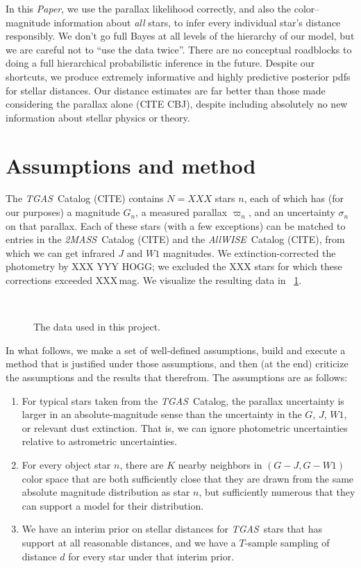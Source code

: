 \documentclass[12pt]{article}
\newcommand{\documentname}{\textsl{Paper}}
\newcommand{\project}[1]{\textsl{#1}}
\newcommand{\acronym}[1]{\small{#1}}
\newcommand{\tgas}{\project{\acronym{TGAS}}}
\newcommand{\twomass}{\project{\acronym{2MASS}}}
\newcommand{\wise}{\project{All\acronym{WISE}}}
\newcommand{\wone}{W\!\mathit{1}}
\begin{document}
In this \documentname, we use the parallax likelihood correctly, and also the
color--magnitude information about \emph{all} stars, to infer every
individual star's distance responsibly.
We don't go full Bayes at all levels of the hierarchy of our model,
but we are careful not to ``use the data twice''.
There are no conceptual roadblocks to doing a full hierarchical
probabilistic inference in the future.
Despite our shortcuts, we produce extremely informative and highly
predictive posterior pdfs for stellar distances.
Our distance estimates are far better than those made considering the
parallax alone (CITE CBJ), despite including absolutely no new
information about stellar physics or theory.

\section{Assumptions and method}

The \tgas\ Catalog (CITE) contains $N=XXX$ stars $n$, each of which has (for
our purposes) a magnitude $G_n$, a measured parallax $\varpi_n$, and
an uncertainty $\sigma_n$ on that parallax.
Each of these stars (with a few exceptions) can be matched to entries
in the \twomass\ Catalog (CITE) and the \wise\ Catalog (CITE), from
which we can get infrared $J$ and $\wone$ magnitudes.
We extinction-corrected the photometry by XXX YYY HOGG; we excluded
the XXX stars for which these corrections exceeded XXX\,mag.
We visualize the resulting data in \figurename~\ref{fig:data}.
%
\begin{figure}[p]
~~
\caption{The data used in this project.\label{fig:data}}
\end{figure}

In what follows, we make a set of well-defined assumptions, build and
execute a method that is justified under those assumptions, and then
(at the end) criticize the assumptions and the results that therefrom.
The assumptions are as follows:
\begin{enumerate}\itemsep=0ex
\item For typical stars taken from the \tgas\ Catalog, the parallax
  uncertainty is larger in an absolute-magnitude sense than the
  uncertainty in the $G$, $J$, $\wone$, or relevant dust extinction. That
  is, we can ignore photometric uncertainties relative to astrometric
  uncertainties.
\item For every object star $n$, there are $K$ nearby neighbors in
  $(G-J, G-\wone)$ color space that are both sufficiently close that they
  are drawn from the same absolute magnitude distribution as star $n$,
  but sufficiently numerous that they can support a model for their
  distribution.
\item We have an interim prior on stellar distances for \tgas\ stars
  that has support at all reasonable distances, and we have a
  $T$-sample sampling of distance $d$ for every star under that
  interim prior.
\end{enumerate}
\end{document}
